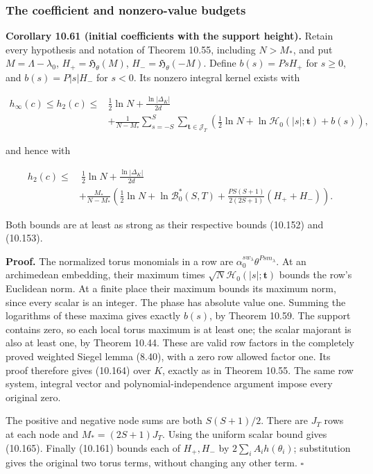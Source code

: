 \documentclass[
  11pt,
  a4paper,
]{article}
\begin{document}
\subsubsection{The coefficient and nonzero-value
budgets}\label{the-coefficient-and-nonzero-value-budgets}

\textbf{Corollary 10.61 (initial coefficients with the support height).}
Retain every hypothesis and notation of Theorem 10.55, including
\(N>M_*\), and put \(M=\Lambda-\lambda_0\),
\(H_+=\mathfrak H_\theta(M)\), \(H_-=\mathfrak H_\theta(-M)\). Define
\(b(s)=PsH_+\) for \(s\ge0\), and \(b(s)=P|s|H_-\) for \(s<0\). Its
nonzero integral kernel exists with

\[
\begin{aligned}
h_\infty(c)\le h_2(c)\le&
\tfrac12\ln N+\frac{\ln|\Delta_K|}{2d}\\
&+\frac1{N-M_*}\sum_{s=-S}^S\sum_{\boldsymbol t\in\mathcal J_T}
\left(\tfrac12\ln N+\ln\mathcal H_0(|s|;\boldsymbol t)+b(s)\right),
\end{aligned}
\tag{10.164}
\]

and hence with

\[
\begin{aligned}
h_2(c)\le&\ \tfrac12\ln N+\frac{\ln|\Delta_K|}{2d}\\
&+\frac{M_*}{N-M_*}\left(
\tfrac12\ln N+\ln\mathcal B_0^*(S,T)
+\frac{PS(S+1)}{2(2S+1)}(H_++H_-)\right).
\end{aligned}
\tag{10.165}
\]

Both bounds are at least as strong as their respective bounds (10.152)
and (10.153).

\textbf{Proof.} The normalized torus monomials in a row are
\(\alpha_0^{s w_\lambda}\theta^{Ps m_\lambda}\). At an archimedean
embedding, their maximum times
\(\sqrt N\mathcal H_0(|s|;\boldsymbol t)\) bounds the row's Euclidean
norm. At a finite place their maximum bounds its maximum norm, since
every scalar is an integer. The phase has absolute value one. Summing
the logarithms of these maxima gives exactly \(b(s)\), by Theorem 10.59.
The support contains zero, so each local torus maximum is at least one;
the scalar majorant is also at least one, by Theorem 10.44. These are
valid row factors in the completely proved weighted Siegel lemma (8.40),
with a zero row allowed factor one. Its proof therefore gives (10.164)
over \(K\), exactly as in Theorem 10.55. The same row system, integral
vector and polynomial-independence argument impose every original zero.

The positive and negative node sums are both \(S(S+1)/2\). There are
\(J_T\) rows at each node and \(M_*=(2S+1)J_T\). Using the uniform
scalar bound gives (10.165). Finally (10.161) bounds each of \(H_+,H_-\)
by \(2\sum_iA_i h(\theta_i)\); substitution gives the original two torus
terms, without changing any other term. \(\square\)
\end{document}
